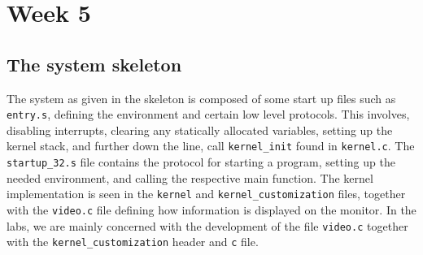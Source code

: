 \section{Week 5}
    
    

\subsection{The system skeleton}

The system as given in the skeleton is composed of some start up files such as \texttt{entry.s}, defining the environment and certain low level protocols. This involves, disabling interrupts, clearing any statically allocated variables, setting up the kernel stack, and further down the line, call \texttt{kernel\_init} found in \texttt{kernel.c}. The \texttt{startup\_32.s} file contains the protocol for starting a program, setting up the needed environment, and calling the respective main function. The kernel implementation is seen in the \texttt{kernel} and \texttt{kernel\_customization} files, together with the \texttt{video.c} file defining how information is displayed on the monitor. In the labs, we are mainly concerned with the development of the file \texttt{video.c} together with the \texttt{kernel\_customization} header and \texttt{c} file. 

